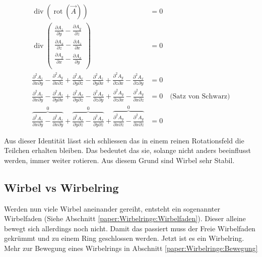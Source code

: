 \begin{align*}
\operatorname{div} \left( \operatorname{rot} \left( \vec{A} \right) \right) 
&= 0\\
\operatorname{div}      
    \begin{pmatrix} 
        \frac{\partial A_z}{\partial y} - \frac{\partial A_y}{\partial z} \\ 
        \frac{\partial A_x}{\partial z} - \frac{\partial A_z}{\partial x} \\ 
        \frac{\partial A_y}{\partial x} - \frac{\partial A_x}{\partial y} \\ 
    \end{pmatrix} 
&= 0\\
\frac{\partial^2 A_z}{\partial x \partial y} - \frac{\partial^2 A_y}{\partial x \partial z} + 
\frac{\partial^2 A_x}{\partial y \partial z} - \frac{\partial^2 A_z}{\partial y \partial x} +
\frac{\partial^2 A_y}{\partial z \partial x} - \frac{\partial^2 A_x}{\partial z \partial y}
&= 0\\
\frac{\partial^2 A_z}{\partial x \partial y} - \frac{\partial^2 A_z}{\partial y \partial x} + 
\frac{\partial^2 A_x}{\partial y \partial z} - \frac{\partial^2 A_x}{\partial z \partial y} +
\frac{\partial^2 A_y}{\partial z \partial x} - \frac{\partial^2 A_y}{\partial x \partial z}
&= 0 \quad \text{(Satz von Schwarz)}\\
\overbrace{\frac{\partial^2 A_z}{\partial x \partial y} - \frac{\partial^2 A_z}{\partial x \partial y}}^0 + 
\overbrace{\frac{\partial^2 A_x}{\partial y \partial z} - \frac{\partial^2 A_x}{\partial y \partial z}}^0 +
\overbrace{\frac{\partial^2 A_y}{\partial x \partial z} - \frac{\partial^2 A_y}{\partial x \partial z}}^0
&= 0 
\end{align*}

Aus dieser Identität lässt sich schliessen das in einem reinen Rotationsfeld die Teilchen erhalten bleiben. 
Das bedeutet das sie, solange nicht anders beeinflusst werden, immer weiter rotieren. 
Aus diesem Grund sind Wirbel sehr Stabil.


\subsection{Wirbel vs Wirbelring}

Werden nun viele Wirbel aneinander gereiht, entsteht ein sogenannter Wirbelfaden (Siehe Abschnitt \ref{paper:Wirbelringe:Wirbelfaden}).
Dieser alleine bewegt sich allerdings noch nicht. 
Damit das passiert muss der Freie Wirbelfaden gekrümmt und zu einem Ring geschlossen werden. 
Jetzt ist es ein Wirbelring. 
Mehr zur Bewegung eines Wirbelrings in Abschnitt \ref{paper:Wirbelringe:Bewegung}
